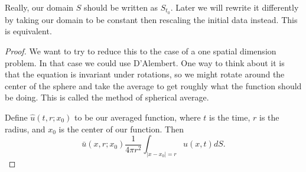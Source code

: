 \begin{remark}
	Really, our domain \( S \) should be written as \( S_{t_{0}} \). Later we will rewrite it differently by taking our domain to be constant then rescaling the initial data instead. This is equivalent.
\end{remark}

\begin{proof}
	We want to try to reduce this to the case of a one spatial dimension problem. In that case we could use D'Alembert. One way to think about it is that the equation is invariant under rotations, so we might rotate around the center of the sphere and take the average to get roughly what the function should be doing. This is called the method of spherical average.

	Define \( \hat u(t, r ; x_{0}) \) to be our averaged function, where \( t \) is the time, \( r \) is the radius, and \( x_{0} \) is the center of our function. Then
	\[ \bar u(x, r ; x_{0}) \frac{1}{4 \pi r^{2}} \int_{|x - x_{0}| = r} u(x, t) dS.  \]


\end{proof}
